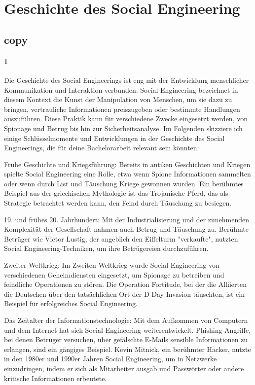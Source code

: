 \section{Geschichte des Social Engineering}

\subsection*{copy}

\paragraph*{1}
Die Geschichte des Social Engineerings ist eng mit der Entwicklung menschlicher Kommunikation und Interaktion verbunden. Social Engineering bezeichnet in diesem Kontext die Kunst der Manipulation von Menschen, um sie dazu zu bringen, vertrauliche Informationen preiszugeben oder bestimmte Handlungen auszuführen. Diese Praktik kann für verschiedene Zwecke eingesetzt werden, von Spionage und Betrug bis hin zur Sicherheitsanalyse. Im Folgenden skizziere ich einige Schlüsselmomente und Entwicklungen in der Geschichte des Social Engineerings, die für deine Bachelorarbeit relevant sein könnten:

Frühe Geschichte und Kriegsführung: Bereits in antiken Geschichten und Kriegen spielte Social Engineering eine Rolle, etwa wenn Spione Informationen sammelten oder wenn durch List und Täuschung Kriege gewonnen wurden. Ein berühmtes Beispiel aus der griechischen Mythologie ist das Trojanische Pferd, das als Strategie betrachtet werden kann, den Feind durch Täuschung zu besiegen.

19. und frühes 20. Jahrhundert: Mit der Industrialisierung und der zunehmenden Komplexität der Gesellschaft nahmen auch Betrug und Täuschung zu. Berühmte Betrüger wie Victor Lustig, der angeblich den Eiffelturm "verkaufte", nutzten Social Engineering-Techniken, um ihre Betrügereien durchzuführen.

Zweiter Weltkrieg: Im Zweiten Weltkrieg wurde Social Engineering von verschiedenen Geheimdiensten eingesetzt, um Spionage zu betreiben und feindliche Operationen zu stören. Die Operation Fortitude, bei der die Alliierten die Deutschen über den tatsächlichen Ort der D-Day-Invasion täuschten, ist ein Beispiel für erfolgreiches Social Engineering.

Das Zeitalter der Informationstechnologie: Mit dem Aufkommen von Computern und dem Internet hat sich Social Engineering weiterentwickelt. Phishing-Angriffe, bei denen Betrüger versuchen, über gefälschte E-Mails sensible Informationen zu erlangen, sind ein gängiges Beispiel. Kevin Mitnick, ein berühmter Hacker, nutzte in den 1980er und 1990er Jahren Social Engineering, um in Netzwerke einzudringen, indem er sich als Mitarbeiter ausgab und Passwörter oder andere kritische Informationen erbeutete.

